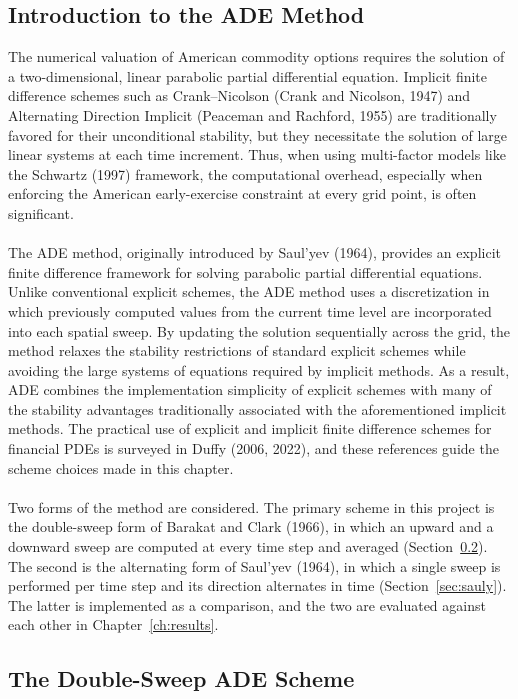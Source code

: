 \documentclass[12pt,a4paper]{article}
\begin{document}
\subsection{Introduction to the ADE Method}
The numerical valuation of American commodity options requires the solution of a two-dimensional, linear parabolic partial differential equation. Implicit finite difference schemes such as Crank--Nicolson (Crank and Nicolson, 1947) and Alternating Direction Implicit (Peaceman and Rachford, 1955) are traditionally favored for their unconditional stability, but they necessitate the solution of large linear systems at each time increment. Thus, when using multi-factor models like the Schwartz (1997) framework, the computational overhead, especially when enforcing the American early-exercise constraint at every grid point, is often significant.\\\\
The ADE method, originally introduced by Saul'yev (1964), provides an explicit finite difference framework for solving parabolic partial differential equations. Unlike conventional explicit schemes, the ADE method uses a discretization in which previously computed values from the current time level are incorporated into each spatial sweep. By updating the solution sequentially across the grid, the method relaxes the stability restrictions of standard explicit schemes while avoiding the large systems of equations required by implicit methods. As a result, ADE combines the implementation simplicity of explicit schemes with many of the stability advantages traditionally associated with the aforementioned implicit methods. The practical use of explicit and implicit finite difference schemes for financial PDEs is surveyed in Duffy (2006, 2022), and these references guide the scheme choices made in this chapter.\\\\
Two forms of the method are considered. The primary scheme in this project is the double-sweep form of Barakat and Clark (1966), in which an upward and a downward sweep are computed at every time step and averaged (Section~\ref{sec:dsweep}). The second is the alternating form of Saul'yev (1964), in which a single sweep is performed per time step and its direction alternates in time (Section~\ref{sec:sauly}). The latter is implemented as a comparison, and the two are evaluated against each other in Chapter~\ref{ch:results}.

\subsection{The Double-Sweep ADE Scheme}\label{sec:dsweep}
\end{document}
